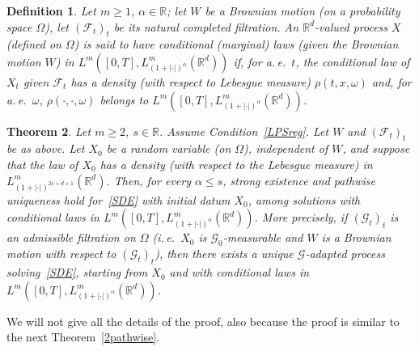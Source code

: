 \documentclass[a4paper,10pt]{article}
\newtheorem{theorem}{Theorem}
\newtheorem{definition}[theorem]{Definition}
\newcommand{\mr}{\mathbb{R}}
\newcommand{\mc}{\mathcal}
\begin{document}
\begin{definition}\label{1defpathw}
Let $m \geq 1$, $\alpha\in\mr$; let $W$ be a Brownian motion (on a probability space $\Omega$), let $(\mc{F}_t)_t$ be its natural completed filtration. An $\mr^d$-valued process $X$ (defined on $\Omega$) is said to have conditional (marginal) laws (given the Brownian motion $W$) in $L^m([0,T],L^m_{(1+|\cdot|)^{\alpha}}(\mr^d))$ if, for a.\,e.\ $t$, the conditional law of $X_t$ given $\mc{F}_t$ has a density (with respect to Lebesgue measure) $\rho(t,x,\omega)$ and, for a.\,e.\ $\omega$, $\rho(\cdot,\cdot,\omega)$ belongs to $L^m([0,T],L^m_{(1+|\cdot|)^{\alpha}}(\mr^d))$.
\end{definition}

\begin{theorem}\label{1pathuniq}
Let $m\ge2$, $s\in\mr$. Assume Condition~\ref{LPSreg}. Let $W$ and $(\mc{F}_t)_t$ be as above. Let $X_0$ be a random variable (on $\Omega$), independent of $W$, and suppose that the law of $X_0$ has a density (with respect to the Lebesgue measure) in $L^m_{(1+|\cdot|)^{2s+d+1}}(\mr^d)$. Then, for every $\alpha\le s$, strong existence and pathwise uniqueness hold for~\eqref{SDE} with initial datum $X_0$, among solutions with conditional laws in $L^m([0,T],L^m_{(1+|\cdot|)^{\alpha}}(\mr^d))$. More precisely, if $(\mc{G}_t)_t$ is an admissible filtration on $\Omega$ (i.\,e.\ $X_0$ is $\mc{G}_0$-measurable and $W$ is a Brownian motion with respect to $(\mc{G}_t)_t$), then there exists a unique $\mc{G}$-adapted process solving~\eqref{SDE}, starting from $X_0$ and with conditional laws in $L^m([0,T],L^m_{(1+|\cdot|)^{\alpha}}(\mr^d))$.
\end{theorem}

We will not give all the details of the proof, also because the proof is similar to the next Theorem~\ref{2pathwise}.
\end{document}
